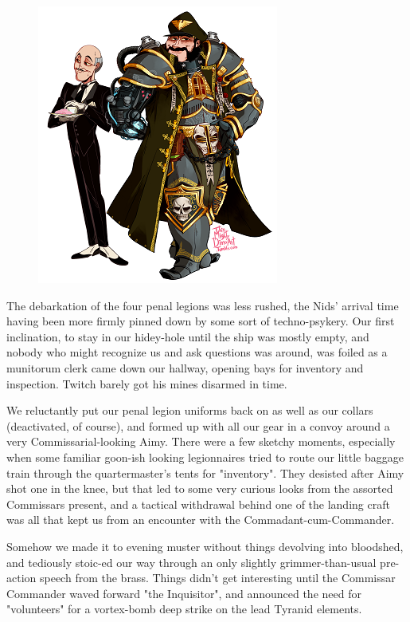 \begin{figure}
	\begin{center}
		\includegraphics[width=\figwidth]{pics/21/123.png}
	\end{center}
\end{figure}
The debarkation of the four penal legions was less rushed, the Nids' arrival time having been more firmly pinned down by some sort of techno-psykery. 
Our first inclination, to stay in our hidey-hole until the ship was mostly empty, and nobody who might recognize us and ask questions was around, was foiled as a munitorum clerk came down our hallway, opening bays for inventory and inspection. 
Twitch barely got his mines disarmed in time.

We reluctantly put our penal legion uniforms back on as well as our collars (deactivated, of course), and formed up with all our gear in a convoy around a very Commissarial-looking Aimy. 
There were a few sketchy moments, especially when some familiar goon-ish looking legionnaires tried to route our little baggage train through the quartermaster's tents for "inventory". 
They desisted after Aimy shot one in the knee, but that led to some very curious looks from the assorted Commissars present, and a tactical withdrawal behind one of the landing craft was all that kept us from an encounter with the Commadant-cum-Commander.

Somehow we made it to evening muster without things devolving into bloodshed, and tediously stoic-ed our way through an only slightly grimmer-than-usual pre-action speech from the brass. 
Things didn't get interesting until the  Commissar Commander waved forward "the Inquisitor", and announced the need for "volunteers" for a vortex-bomb deep strike on the lead Tyranid elements.

